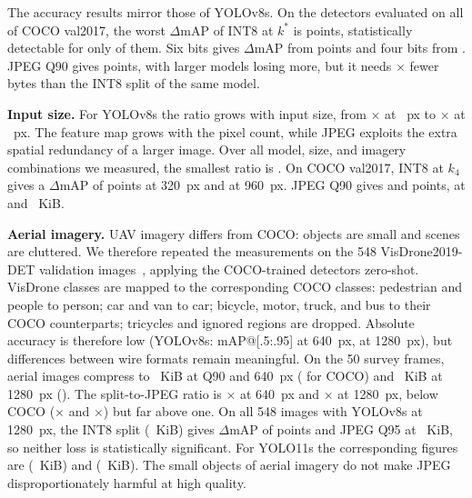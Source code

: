 \documentclass[journal,twocolumn,10pt]{IEEEtran}
\begin{document}
The accuracy results mirror those of YOLOv8s. On the \GenNAccModels{} detectors evaluated on all of COCO val2017, the worst $\Delta$mAP of INT8 at $k^\ast$ is \GenIntEightWorst{} points, statistically detectable for only \GenIntEightSignificant{} of them. Six bits gives $\Delta$mAP from \GenIntSixRange{} points and four bits from \GenIntFourRange{}. JPEG Q90 gives \GenJpegNinetyRange{} points, with larger models losing more, but it needs \GenAccWireRatioRange$\times$ fewer bytes than the INT8 split of the same model.

\textbf{Input size.} For YOLOv8s the ratio grows with input size, from \GenResRatioSmall$\times$ at \GenResSizeSmall~px to \GenResRatioLarge$\times$ at \GenResSizeLarge~px. The feature map grows with the pixel count, while JPEG exploits the extra spatial redundancy of a larger image. Over all \GenNSurveyRows{} model, size, and imagery combinations we measured, the smallest ratio is \GenResMinRatioAllModels. On COCO val2017, INT8 at $k_4$ gives a $\Delta$mAP of \GenResThreeTwentyIntEight{} points at 320~px and \GenResNineSixtyIntEight{} at 960~px. JPEG Q90 gives \GenResThreeTwentyJpegNinety{} and \GenResNineSixtyJpegNinety{} points, at \GenResThreeTwentyJpegNinetyKiB{} and \GenResNineSixtyJpegNinetyKiB~KiB.

\textbf{Aerial imagery.} UAV imagery differs from COCO: objects are small and scenes are cluttered. We therefore repeated the measurements on the 548 VisDrone2019-DET validation images~\cite{zhu2022visdrone}, applying the COCO-trained detectors zero-shot. VisDrone classes are mapped to the corresponding COCO classes: pedestrian and people to person; car and van to car; bicycle, motor, truck, and bus to their COCO counterparts; tricycles and ignored regions are dropped. Absolute accuracy is therefore low (YOLOv8s: \GenAerialBaseVEightSLow{} mAP@[.5:.95] at 640~px, \GenAerialBaseVEightSHigh{} at 1280~px), but differences between wire formats remain meaningful. On the 50 survey frames, aerial images compress to \GenAerialJpegKiBLow{}~KiB at Q90 and 640~px (\GenCocoJpegKiBLow{} for COCO) and \GenAerialJpegKiBHigh{}~KiB at 1280~px (\GenCocoJpegKiBHigh{}). The split-to-JPEG ratio is \GenAerialRatioLow$\times$ at 640~px and \GenAerialRatioHigh$\times$ at 1280~px, below COCO (\GenCocoRatioLow$\times$ and \GenCocoRatioHigh$\times$) but far above one. On all 548 images with YOLOv8s at 1280~px, the INT8 split (\GenAerialIntEightVEightSHighKiB~KiB) gives $\Delta$mAP of \GenAerialIntEightVEightSHigh{} points and JPEG Q95 \GenAerialJpegNinetyFiveVEightSHigh{} at \GenAerialJpegNinetyFiveVEightSHighKiB~KiB, so neither loss is statistically significant. For YOLO11s the corresponding figures are \GenAerialIntEightElevenSHigh{} (\GenAerialIntEightElevenSHighKiB~KiB) and \GenAerialJpegNinetyFiveElevenSHigh{} (\GenAerialJpegNinetyFiveElevenSHighKiB~KiB). The small objects of aerial imagery do not make JPEG disproportionately harmful at high quality.
\end{document}
